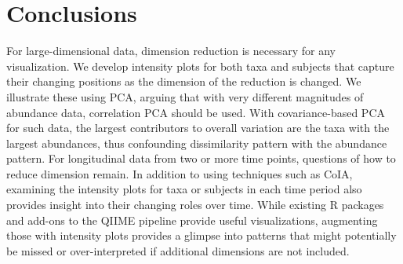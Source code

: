 \documentclass[doublespacing]{bmcart}
\begin{document}
\section*{Conclusions}
For large-dimensional data, dimension reduction is necessary for any visualization. We develop intensity plots for both taxa and subjects that capture their changing positions as the dimension of the reduction is changed. We illustrate these using PCA, arguing that with very different magnitudes of abundance data, correlation PCA should be used. With covariance-based PCA for such data, the largest contributors to overall variation are the taxa with the largest abundances, thus confounding dissimilarity pattern with the abundance pattern. For longitudinal data from two or more time points, questions of how to reduce dimension remain. In addition to using techniques such as CoIA, examining the intensity plots for taxa or subjects in each time period also provides insight into their changing roles over time. While existing R packages and add-ons to the QIIME pipeline provide useful visualizations, augmenting those with intensity plots provides a glimpse into patterns that might potentially be missed or over-interpreted if additional dimensions are not included. 


\end{document}

